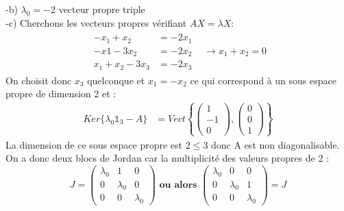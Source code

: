 \documentclass[../main.tex]{subfiles}
\begin{document}
-b) $\lambda_0 = -2$ vecteur propre triple\\

-c) Cherchons les vecteurs propres vérifiant $AX = \lambda X$:
\begin{align*}
\begin{matrix}
-x_1 + x_2 &= -2x_1\\
-x1 -3x_2 &= -2x_2\\
x_1+x_2 - 3x_3 &= -2x_3
\end{matrix} &\rightarrow x_1 + x_2 =0
\end{align*}
On choisit donc $x_3$ quelconque et $x_1=-x_2$ ce qui correspond à un sous espace propre de dimension 2 et :
\begin{align*}
Ker\{ \lambda_0 \mathbb{1}_3 - A\} &= Vect \left\{ \begin{pmatrix}
1\\-1\\0
\end{pmatrix} , \begin{pmatrix}
0\\0\\1
\end{pmatrix} \right \}
\end{align*}
La dimension de ce sous espace propre est $2 \leq 3$ donc A est non diagonalisable.\\
On a donc deux blocs de Jordan car la multiplicité des valeurs propres de 2 :
\[J=\begin{pmatrix}
\lambda_0 & 1 & 0\\
0 & \lambda_0 & 0\\
0 & 0 & \lambda_0
\end{pmatrix} \textbf{ 	ou alors   } \begin{pmatrix}
\lambda_0 & 0 & 0\\
0 & \lambda_0 & 1\\
0 & 0 &\lambda_0
\end{pmatrix} = J\]
\end{document}
